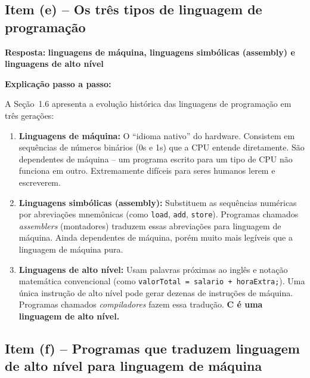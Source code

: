 \documentclass[12pt,a4paper]{article}
\begin{document}
\bigskip

\subsection*{Item (e) -- Os três tipos de linguagem de programação}

\begin{respostabox}
\textbf{Resposta:} \textcolor{deitelblue}{\textbf{linguagens de máquina, linguagens simbólicas (assembly) e linguagens de alto nível}}

\medskip
\textbf{Explicação passo a passo:}

A Seção~1.6 apresenta a evolução histórica das linguagens de programação em três gerações:

\begin{enumerate}
  \item \textbf{Linguagens de máquina:} O ``idioma nativo'' do hardware. Consistem em
  sequências de números binários (0s e 1s) que a CPU entende diretamente. São
  dependentes de máquina -- um programa escrito para um tipo de CPU não funciona
  em outro. Extremamente difíceis para seres humanos lerem e escreverem.

  \item \textbf{Linguagens simbólicas (assembly):} Substituem as sequências numéricas por
  abreviações mnemônicas (como \texttt{load}, \texttt{add}, \texttt{store}). Programas
  chamados \textit{assemblers} (montadores) traduzem essas abreviações para linguagem de
  máquina. Ainda dependentes de máquina, porém muito mais legíveis que a linguagem de máquina pura.

  \item \textbf{Linguagens de alto nível:} Usam palavras próximas ao inglês e notação
  matemática convencional (como \texttt{valorTotal = salario + horaExtra;}). Uma única
  instrução de alto nível pode gerar dezenas de instruções de máquina. Programas chamados
  \textit{compiladores} fazem essa tradução. \textbf{C é uma linguagem de alto nível.}
\end{enumerate}
\end{respostabox}

\bigskip

\subsection*{Item (f) -- Programas que traduzem linguagem de alto nível para linguagem de máquina}
\end{document}
